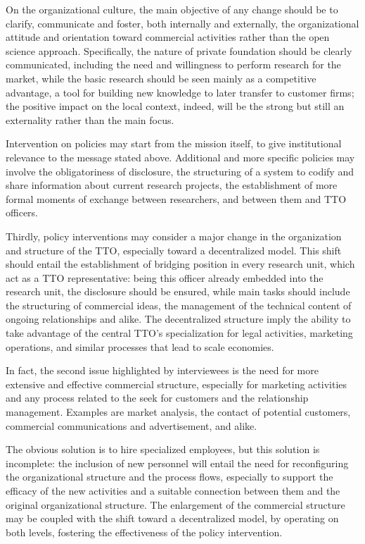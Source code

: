 On the organizational culture, the main objective of any change should be to clarify, communicate and foster, both internally and externally, the organizational attitude and orientation toward commercial activities rather than the open science approach. Specifically, the nature of private foundation should be clearly communicated, including the need and willingness to perform research for the market, while the basic research should be seen mainly as a competitive advantage, a tool for building new knowledge to later transfer to customer firms; the positive impact on the local context, indeed, will be the strong but still an externality rather than the main focus. 

Intervention on policies may start from the mission itself, to give institutional relevance to the message stated above. Additional and more specific policies may involve the obligatoriness of disclosure, the structuring of a system to codify and share information about current research projects, the establishment of more formal moments of exchange between researchers, and between them and TTO officers.

Thirdly, policy interventions may consider a major change in the organization and structure of the TTO, especially toward a decentralized model. This shift should entail the establishment of bridging position in every research unit, which act as a TTO representative: being this officer already embedded into the research unit, the disclosure should be ensured, while main tasks should include the structuring of commercial ideas, the management of the technical content of ongoing relationships and alike. The decentralized structure imply the ability to take advantage of the central TTO's specialization for legal activities, marketing operations, and similar processes that lead to scale economies.

In fact, the second issue highlighted by interviewees is the need for more extensive and effective commercial structure, especially for marketing activities and any process related to the seek for customers and the relationship management. Examples are market analysis, the contact of potential customers, commercial communications and advertisement, and alike. 

The obvious solution is to hire specialized employees, but this solution is incomplete: the inclusion of new personnel will entail the need for reconfiguring the organizational structure and the process flows, especially to support the efficacy of the new activities and a suitable connection between them and the original organizational structure. The enlargement of the commercial structure may be coupled with the shift toward a decentralized model, by operating on both levels, fostering the effectiveness of the policy intervention.

